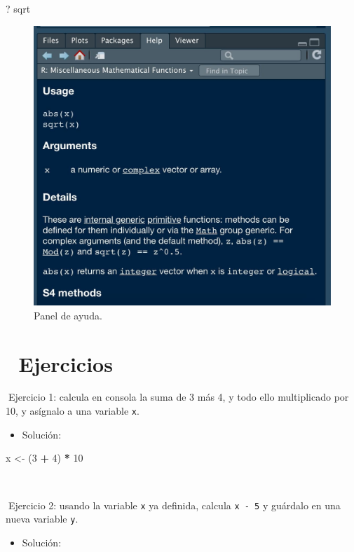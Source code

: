 \documentclass[11pt,]{book}
\newenvironment{Shaded}{\begin{snugshade}}{\end{snugshade}}
\newcommand{\DecValTok}[1]{\textcolor[rgb]{0.06,0.06,0.06}{#1}}
\newcommand{\NormalTok}[1]{#1}
\newcommand{\OperatorTok}[1]{\textcolor[rgb]{0.43,0.43,0.43}{\textbf{#1}}}
\newcommand{\StringTok}[1]{\textcolor[rgb]{0.5,0.5,0.5}{#1}}
\providecommand{\tightlist}{%
  \setlength{\itemsep}{0pt}\setlength{\parskip}{0pt}}
\begin{document}
\begin{Shaded}
\begin{Highlighting}[]
\NormalTok{? sqrt}
\end{Highlighting}
\end{Shaded}

\begin{figure}

{\centering \includegraphics[width=0.5\linewidth]{./img/panel_ayuda} 

}

\caption{Panel de ayuda.}\label{fig:unnamed-chunk-9}
\end{figure}

\hypertarget{ejercicios}{%
\section{📝 Ejercicios}\label{ejercicios}}

📝Ejercicio 1: calcula en consola la suma de 3 más 4, y todo ello multiplicado por 10, y asígnalo a una variable \texttt{x}.

\begin{itemize}
\tightlist
\item
  Solución:
\end{itemize}

\begin{Shaded}
\begin{Highlighting}[]
\NormalTok{x <-}\StringTok{ }\NormalTok{(}\DecValTok{3} \OperatorTok{+}\StringTok{ }\DecValTok{4}\NormalTok{) }\OperatorTok{*}\StringTok{ }\DecValTok{10}
\end{Highlighting}
\end{Shaded}

~

📝Ejercicio 2: usando la variable \texttt{x} ya definida, calcula \texttt{x\ -\ 5} y guárdalo en una nueva variable \texttt{y}.

\begin{itemize}
\tightlist
\item
  Solución:
\end{itemize}
\end{document}
